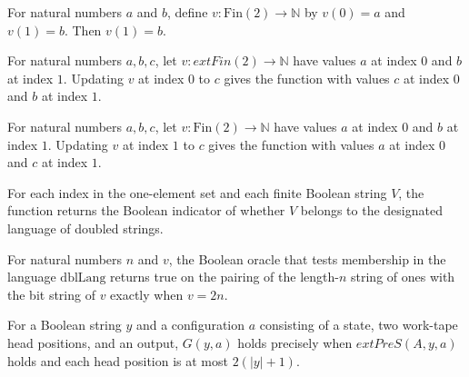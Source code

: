 \begin{lemma}
\label{Complexity.LtM.vv_1}
\leanok
{}
For natural numbers $a$ and $b$, define $v:\mathrm{Fin}(2)\to\mathbb{N}$ by $v(0)=a$ and $v(1)=b$.
Then $v(1)=b$.
\end{lemma}

\begin{lemma}
\label{Complexity.LtM.upd_0}
\leanok
{}
For natural numbers $a,b,c$, let $v:	ext{Fin}(2)\to\mathbb{N}$ have values $a$ at index
$0$ and $b$ at index $1$. Updating $v$ at index $0$ to $c$ gives the function with
values $c$ at index $0$ and $b$ at index $1$.
\end{lemma}

\begin{lemma}
\label{Complexity.LtM.upd_1}
\leanok
{}
For natural numbers $a,b,c$, let $v:\text{Fin}(2)\to\mathbb{N}$ have values $a$ at index
$0$ and $b$ at index $1$. Updating $v$ at index $1$ to $c$ gives the function with
values $a$ at index $0$ and $c$ at index $1$.
\end{lemma}

\begin{definition}
\label{Complexity.LtM.orc}
\leanok
{}
For each index in the one-element set and each finite Boolean string $V$, the function
returns the Boolean indicator of whether $V$ belongs to the designated language of
doubled strings.
\end{definition}

\begin{lemma}
\label{Complexity.LtM.orc_eq}
\leanok
{}
For natural numbers $n$ and $v$, the Boolean oracle that tests membership in the
language $\mathrm{dblLang}$ returns true on the pairing of the length-$n$ string of ones
with the bit string of $v$ exactly when $v=2n$.
\end{lemma}

\begin{definition}
\label{Complexity.LtM.G}
\leanok
{}
For a Boolean string $y$ and a configuration $a$ consisting of a state, two work-tape
head positions, and an output, $G(y,a)$ holds precisely when $	ext{PreS}(A,y,a)$ holds
and each head position is at most $2(|y|+1)$.
\end{definition}

